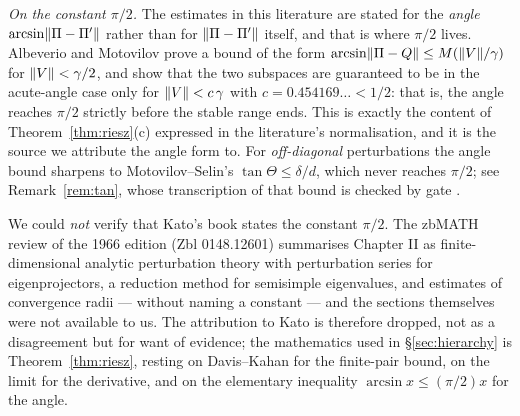 \emph{On the constant $\pi/2$.} The estimates in this literature are stated for the
\emph{angle} $\arcsin\lVert\Pi-\Pi'\rVert$ rather than for $\lVert\Pi-\Pi'\rVert$ itself, and that is where
$\pi/2$ lives. Albeverio and Motovilov \Cc{} prove a bound of the form
$\arcsin\lVert\Pi-Q\rVert\le M(\lVert V\rVert/\gamma)$ for $\lVert V\rVert<\gamma/2$, and show that the two subspaces
are guaranteed to be in the acute-angle case only for $\lVert V\rVert<c\,\gamma$ with
$c=0.454169\ldots<1/2$: that is, the angle reaches $\pi/2$ strictly before the stable range ends.
This is exactly the content of Theorem~\ref{thm:riesz}(c) expressed in the literature's
normalisation, and it is the source we attribute the angle form to. For \emph{off-diagonal}
perturbations the angle bound sharpens to Motovilov--Selin's $\tan\Theta\le\delta/d$, which never
reaches $\pi/2$; see Remark~\ref{rem:tan}, whose transcription of that bound is checked by gate
.

We could \emph{not} verify that Kato's book states the constant $\pi/2$. The zbMATH review of the
1966 edition (Zbl 0148.12601) summarises Chapter II as finite-dimensional analytic perturbation
theory with perturbation series for eigenprojectors, a reduction method for semisimple
eigenvalues, and estimates of convergence radii --- without naming a constant --- and the sections
themselves were not available to us. The attribution to Kato is therefore dropped, not as a
disagreement but for want of evidence; the mathematics used in \S\ref{sec:hierarchy} is
Theorem~\ref{thm:riesz}, resting on Davis--Kahan for the finite-pair bound, on the limit for the
derivative, and on the elementary inequality $\arcsin x\le(\pi/2)x$ for the angle.

